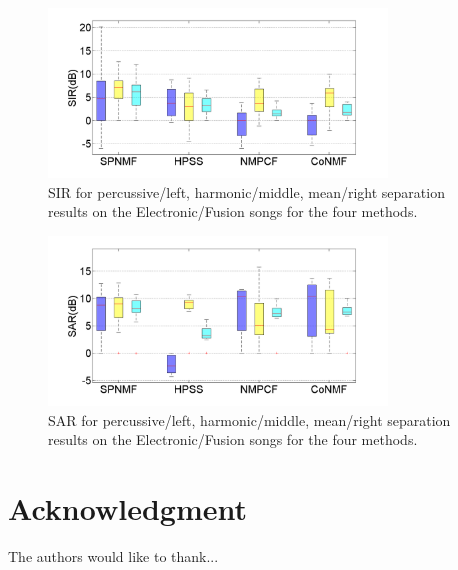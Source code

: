 \documentclass[journal]{IEEEtran}
\begin{document}
\begin{figure}[h]

  \centering 
  \includegraphics[width=9cm]{fig/ElectroFusionSIR.png}
  \caption{\label{ElectroFusionSIR} SIR for percussive/left, harmonic/middle, mean/right separation results on the Electronic/Fusion songs for the four methods.}
  
\end{figure}

\begin{figure}[h]

  \centering 
  \includegraphics[width=9cm]{fig/ElectroFusionSAR.png}
  \caption{\label{ElectroFusionSAR} SAR for percussive/left, harmonic/middle, mean/right separation results on the Electronic/Fusion songs for the four methods.}
  
\end{figure}


\section*{Acknowledgment}


The authors would like to thank...


\ifCLASSOPTIONcaptionsoff
  \newpage
\fi



\end{document}
